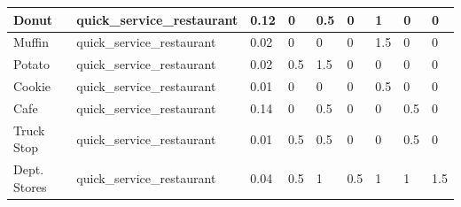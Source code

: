 \begin{table}[]
\begin{tabular}{|l|l|l|l|l|l|l|l|l|}
    Donut                    & quick\_service\_restaurant      & 0.12                               & 0                & 0.5            & 0                & 1             & 0              & 0                \\ \hline
    Muffin                   & quick\_service\_restaurant      & 0.02                               & 0                & 0              & 0                & 1.5           & 0              & 0                \\ \hline
    Potato                   & quick\_service\_restaurant      & 0.02                               & 0.5              & 1.5            & 0                & 0             & 0              & 0                \\ \hline
    Cookie                   & quick\_service\_restaurant      & 0.01                               & 0                & 0              & 0                & 0.5           & 0              & 0                \\ \hline
    Cafe                     & quick\_service\_restaurant      & 0.14                               & 0                & 0.5            & 0                & 0             & 0.5            & 0                \\ \hline
    Truck Stop               & quick\_service\_restaurant      & 0.01                               & 0.5              & 0.5            & 0                & 0             & 0.5            & 0                \\ \hline
    Dept. Stores             & quick\_service\_restaurant      & 0.04                               & 0.5              & 1              & 0.5              & 1             & 1              & 1.5              \\ \hline
    \end{tabular}
    \end{table}